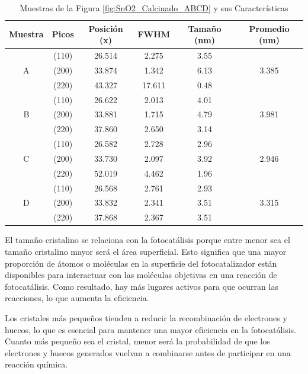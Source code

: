 \documentclass[12pt]{article}
\begin{document}
\begin{table}[h!]
\caption{Muestras de la Figura \ref{fig:SnO2_Calcinado_ABCD} y sus Características}
  \centering
  \begin{tabular}{|c|c|c|c|c|c|}
    \hline
    Muestra & Picos & Posición (x) & FWHM & Tamaño (nm) & Promedio (nm)\\
    \hline
    & (110) & 26.514 & 2.275 & 3.55 & \\
    A & (200) & 33.874 & 1.342 & 6.13 & \textcolor[rgb]{0.56,0.07,1}{3.385}\\
    & (220) & 43.327 & 17.611 & 0.48 & \\
    \hline
    & (110) & 26.622 & 2.013 & 4.01 & \\
    B & (200) & 33.881 & 1.715 & 4.79 & \textcolor[rgb]{0.56,0.07,1}{3.981}\\
    & (220) & 37.860 & 2.650 & 3.14 & \\
    \hline
    & (110) & 26.582 & 2.728 & 2.96 & \\
    C & (200) & 33.730 & 2.097 & 3.92 & \textcolor[rgb]{0.56,0.07,1}{2.946}\\
    & (220) & 52.019 & 4.462 & 1.96 & \\
    \hline
    & (110) & 26.568 & 2.761 & 2.93 & \\
    D & (200) & 33.832 & 2.341 & 3.51 & \textcolor[rgb]{0.56,0.07,1}{3.315}\\
    & (220) & 37.868 & 2.367 & 3.51 & \\
    \hline
  \end{tabular}
  \label{tab:drx2}
\end{table}


El tamaño cristalino se relaciona con la fotocatálisis porque entre menor sea el tamaño cristalino mayor será el área superficial. Esto significa que una mayor proporción de átomos o moléculas en la superficie del fotocatalizador están disponibles para interactuar con las moléculas objetivas en una reacción de fotocatálisis. Como resultado, hay más lugares activos para que ocurran las reacciones, lo que aumenta la eficiencia.\vspace{1em} %

Los cristales más pequeños tienden a reducir la recombinación de electrones y huecos, lo que es esencial para mantener una mayor eficiencia en la fotocatálisis. Cuanto más pequeño sea el cristal, menor será la probabilidad de que los electrones y huecos generados vuelvan a combinarse antes de participar en una reacción química.\vspace{1em} %
\end{document}
